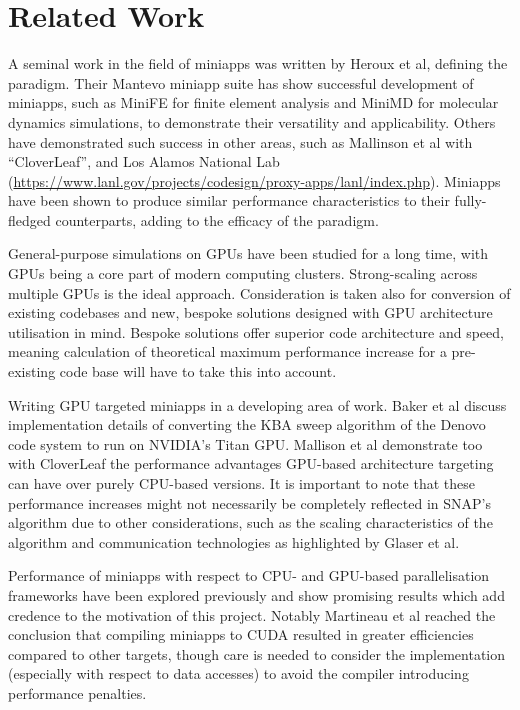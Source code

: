 \documentclass[conference]{IEEEtran}
\begin{document}

\section{Related Work}

A seminal work in the field of miniapps was written by Heroux et al\cite{miniapps}, defining the paradigm. Their Mantevo miniapp suite has show successful development of miniapps, such as MiniFE for finite element analysis and MiniMD for molecular dynamics simulations, to demonstrate their versatility and applicability. Others have demonstrated such success in other areas, such as Mallinson et al with ``CloverLeaf”\cite{mallinson2013cloverleaf}, and Los Alamos National Lab (\url{https://www.lanl.gov/projects/codesign/proxy-apps/lanl/index.php}). Miniapps have been shown to produce similar performance characteristics to their fully-fledged counterparts\cite{miniapps}, adding to the efficacy of the paradigm.

General-purpose simulations on GPUs have been studied for a long time, with GPUs being a core part of modern computing clusters\cite{debardeleben2013gpu}. Strong-scaling across multiple GPUs\cite{glaser2015strong} is the ideal approach. Consideration is taken also for conversion of existing codebases\cite{zhou2011gpu} and new, bespoke solutions designed with GPU architecture utilisation in mind\cite{glaser2015strong}. Bespoke solutions offer superior code architecture and speed, meaning calculation of theoretical maximum performance increase for a pre-existing code base will have to take this into account.

Writing GPU targeted miniapps in a developing area of work. Baker et al\cite{baker2012high} discuss implementation details of converting the KBA sweep algorithm of the Denovo code system to run on NVIDIA’s Titan GPU. Mallison et al\cite{mallinson2013cloverleaf} demonstrate too with CloverLeaf the performance advantages GPU-based architecture targeting can have over purely CPU-based versions. It is important to note that these performance increases might not necessarily be completely reflected in SNAP’s algorithm due to other considerations, such as the scaling characteristics of the algorithm\cite{shoukourian2014predicting} and communication technologies as highlighted by Glaser et al\cite{glaser2015strong}.

Performance of miniapps with respect to CPU- and GPU-based parallelisation frameworks have been explored previously and show promising results which add credence to the motivation of this project. Notably Martineau et al\cite{martineau2017productivity} reached the conclusion that compiling miniapps to CUDA resulted in greater efficiencies compared to other targets, though care is needed to consider the implementation (especially with respect to data accesses) to avoid the compiler introducing performance penalties.
\end{document}
